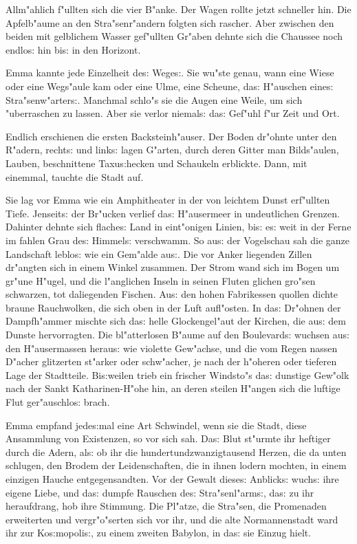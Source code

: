 \documentclass[oneside,12pt]{book}
\newcommand{\s}{s:}%
\begin{document}
Allm"ahlich f"ullten sich die vier B"anke. Der Wagen rollte jetzt
schneller hin. Die Apfelb"aume an den Stra"senr"andern folgten
sich rascher. Aber zwischen den beiden mit gelblichem Wasser
gef"ullten Gr"aben dehnte sich die Chaussee noch endlo{\s} hin
bi{\s} in den Horizont.

Emma kannte jede Einzelheit de{\s} Wege{\s}. Sie wu"ste genau,
wann eine Wiese oder eine Wegs"aule kam oder eine Ulme, eine
Scheune, da{\s} H"auschen eine{\s} Stra"senw"arter{\s}. Manchmal
schlo"s sie die Augen eine Weile, um sich "uberraschen zu lassen.
Aber sie verlor niemal{\s} da{\s} Gef"uhl f"ur Zeit und Ort.

Endlich erschienen die ersten Backsteinh"auser. Der Boden dr"ohnte
unter den R"adern, recht{\s} und link{\s} lagen G"arten, durch
deren Gitter man Bilds"aulen, Lauben, beschnittene Taxu{\s}hecken
und Schaukeln erblickte. Dann, mit einemmal, tauchte die Stadt auf.

Sie lag vor Emma wie ein Amphitheater in der von leichtem Dunst
erf"ullten Tiefe. Jenseit{\s} der Br"ucken verlief da{\s}
H"ausermeer in undeutlichen Grenzen. Dahinter dehnte sich
flache{\s} Land in eint"onigen Linien, bi{\s} e{\s} weit in der
Ferne im fahlen Grau de{\s} Himmel{\s} verschwamm. So au{\s} der
Vogelschau sah die ganze Landschaft leblo{\s} wie ein Gem"alde
au{\s}. Die vor Anker liegenden Zillen dr"angten sich in einem
Winkel zusammen. Der Strom wand sich im Bogen um gr"une H"ugel,
und die l"anglichen Inseln in seinen Fluten glichen gro"sen
schwarzen, tot daliegenden Fischen. Au{\s} den hohen Fabrikessen
quollen dichte braune Rauchwolken, die sich oben in der Luft
aufl"osten. In da{\s} Dr"ohnen der Dampfh"ammer mischte sich
da{\s} helle Glockengel"aut der Kirchen, die au{\s} dem Dunste
hervorragten. Die bl"atterlosen B"aume auf den Boulevard{\s}
wuchsen au{\s} den H"ausermassen herau{\s} wie violette Gew"achse,
und die vom Regen nassen D"acher glitzerten st"arker oder
schw"acher, je nach der h"oheren oder tieferen Lage der
Stadtteile. Bi{\s}weilen trieb ein frischer Windsto"s da{\s}
dunstige Gew"olk nach der Sankt Katharinen-H"ohe hin, an deren
steilen H"angen sich die luftige Flut ger"auschlo{\s} brach.

Emma empfand jede{\s}mal eine Art Schwindel, wenn sie die Stadt,
diese Ansammlung von Existenzen, so vor sich sah. Da{\s} Blut
st"urmte ihr heftiger durch die Adern, al{\s} ob ihr die
hundertundzwanzigtausend Herzen, die da unten schlugen, den Brodem
der Leidenschaften, die in ihnen lodern mochten, in einem einzigen
Hauche entgegensandten. Vor der Gewalt diese{\s} Anblick{\s}
wuch{\s} ihre eigene Liebe, und da{\s} dumpfe Rauschen de{\s}
Stra"senl"arm{\s}, da{\s} zu ihr heraufdrang, hob ihre Stimmung.
Die Pl"atze, die Stra"sen, die Promenaden erweiterten und
vergr"o"serten sich vor ihr, und die alte Normannenstadt ward ihr
zur Ko{\s}mopoli{\s}, zu einem zweiten Babylon, in da{\s} sie
Einzug hielt.
\end{document}
